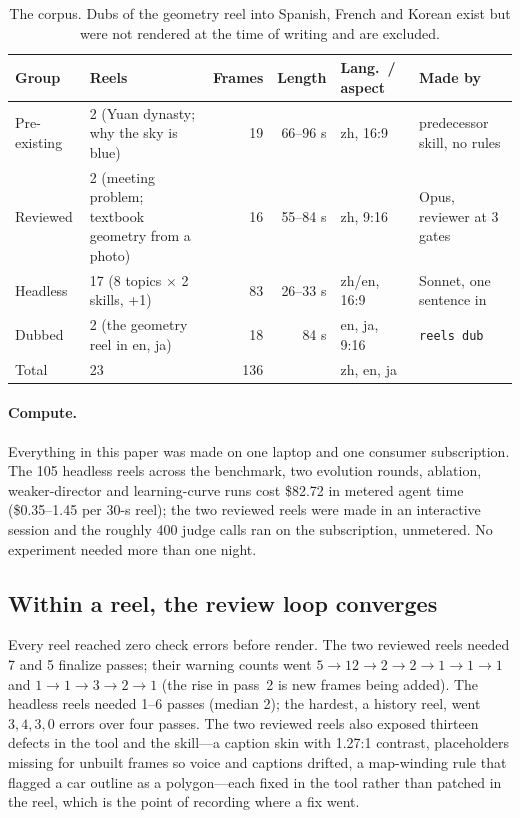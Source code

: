 \documentclass[11pt]{article}
\begin{document}
\begin{table}[t]
\centering\small
\begin{tabular}{lp{4.3cm}rrlp{3.4cm}}
\toprule
Group & Reels & Frames & Length & Lang.\ / aspect & Made by \\
\midrule
Pre-existing & 2 (Yuan dynasty; why the sky is blue) & 19 & 66--96 s & zh, 16:9 & predecessor skill, no rules \\
Reviewed & 2 (meeting problem; textbook geometry from a photo) & 16 & 55--84 s & zh, 9:16 & Opus, reviewer at 3 gates \\
Headless & 17 (8 topics $\times$ 2 skills, +1) & 83 & 26--33 s & zh/en, 16:9 & Sonnet, one sentence in \\
Dubbed & 2 (the geometry reel in en, ja) & 18 & 84 s & en, ja, 9:16 & \texttt{reels dub} \\
\midrule
Total & 23 & 136 & & zh, en, ja & \\
\bottomrule
\end{tabular}
\caption{The corpus. Dubs of the geometry reel into Spanish, French and Korean exist but were not
rendered at the time of writing and are excluded.}
\label{tab:corpus}
\end{table}

\paragraph{Compute.} Everything in this paper was made on one laptop and one consumer subscription.
The 105 headless reels across the benchmark, two evolution rounds, ablation, weaker-director and
learning-curve runs cost \$82.72 in metered agent time (\$0.35--1.45 per 30-s reel); the two reviewed reels were made
in an interactive session and the roughly 400 judge calls ran on the subscription, unmetered. No
experiment needed more than one night.

\subsection{Within a reel, the review loop converges}
Every reel reached zero check errors before render. The two reviewed reels needed 7 and 5 finalize
passes; their warning counts went $5 \rightarrow 12 \rightarrow 2 \rightarrow 2 \rightarrow 1
\rightarrow 1 \rightarrow 1$ and $1 \rightarrow 1 \rightarrow 3 \rightarrow 2 \rightarrow 1$ (the rise
in pass~2 is new frames being added). The headless reels needed 1--6 passes (median 2); the hardest,
a history reel, went $3, 4, 3, 0$ errors over four passes. The two reviewed reels also exposed
thirteen defects in the tool and the skill---a caption skin with 1.27:1 contrast, placeholders
missing for unbuilt frames so voice and captions drifted, a map-winding rule that flagged a car
outline as a polygon---each fixed in the tool rather than patched in the reel, which is the point of recording where a fix went.
\end{document}
